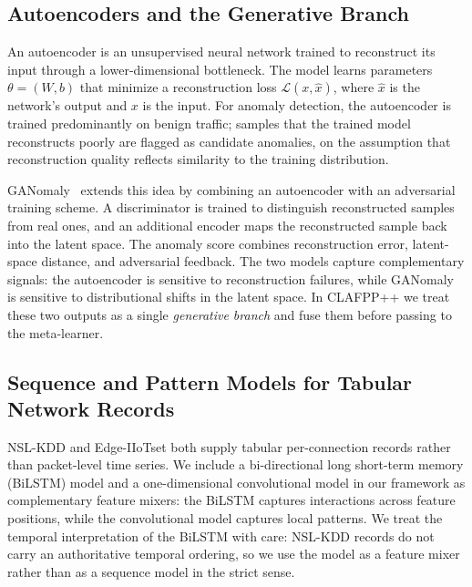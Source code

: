 \documentclass[pdflatex,sn-mathphys-num]{sn-jnl}
\theoremstyle{thmstyleone}
\theoremstyle{thmstyletwo}
\theoremstyle{thmstylethree}
\begin{document}
\subsection{Autoencoders and the Generative Branch}
An autoencoder is an unsupervised neural network trained to reconstruct its input through a lower-dimensional bottleneck. The model learns parameters $\theta = (W, b)$ that minimize a reconstruction loss $\mathcal{L}(x, \hat{x})$, where $\hat{x}$ is the network's output and $x$ is the input. For anomaly detection, the autoencoder is trained predominantly on benign traffic; samples that the trained model reconstructs poorly are flagged as candidate anomalies, on the assumption that reconstruction quality reflects similarity to the training distribution.

GANomaly~\cite{akcay2019ganomaly} extends this idea by combining an autoencoder with an adversarial training scheme. A discriminator is trained to distinguish reconstructed samples from real ones, and an additional encoder maps the reconstructed sample back into the latent space. The anomaly score combines reconstruction error, latent-space distance, and adversarial feedback. The two models capture complementary signals: the autoencoder is sensitive to reconstruction failures, while GANomaly is sensitive to distributional shifts in the latent space. In CLAFPP++ we treat these two outputs as a single \emph{generative branch} and fuse them before passing to the meta-learner.

\subsection{Sequence and Pattern Models for Tabular Network Records}
NSL-KDD and Edge-IIoTset both supply tabular per-connection records rather than packet-level time series. We include a bi-directional long short-term memory (BiLSTM) model and a one-dimensional convolutional model in our framework as complementary feature mixers: the BiLSTM captures interactions across feature positions, while the convolutional model captures local patterns. We treat the temporal interpretation of the BiLSTM with care: NSL-KDD records do not carry an authoritative temporal ordering, so we use the model as a feature mixer rather than as a sequence model in the strict sense.
\end{document}
